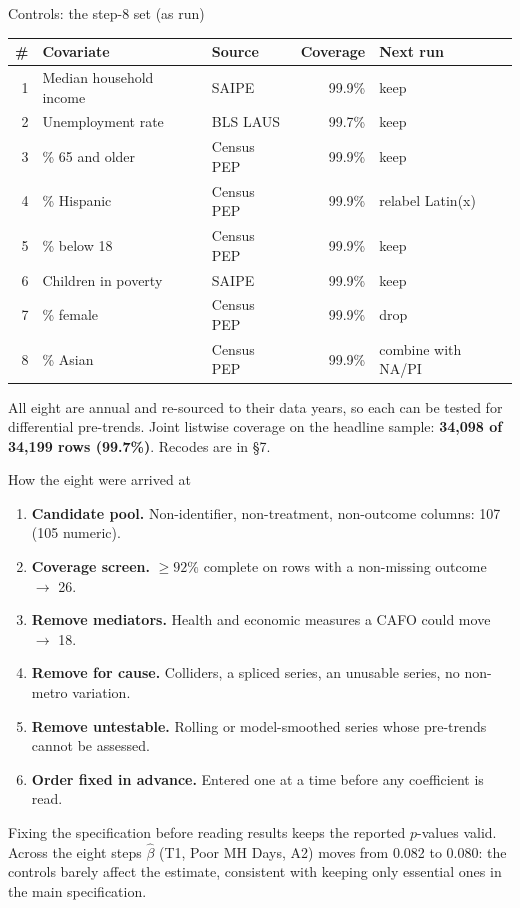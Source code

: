 \documentclass[aspectratio=169]{beamer}
\begin{document}
\begin{frame}{Controls: the step-8 set (as run)}
\vspace{-4pt}
\begin{center}\footnotesize
\begin{tabular}{@{}rllrl@{}}
\toprule
\# & Covariate & Source & Coverage & Next run \\
\midrule
1 & Median household income & SAIPE & 99.9\% & keep \\
2 & Unemployment rate & BLS LAUS & 99.7\% & keep \\
3 & \% 65 and older & Census PEP & 99.9\% & keep \\
4 & \% Hispanic & Census PEP & 99.9\% & relabel Latin(x) \\
5 & \% below 18 & Census PEP & 99.9\% & keep \\
6 & Children in poverty & SAIPE & 99.9\% & keep \\
7 & \% female & Census PEP & 99.9\% & \alert{drop} \\
8 & \% Asian & Census PEP & 99.9\% & combine with NA/PI \\
\bottomrule
\end{tabular}
\end{center}
\vspace{0.3em}
{\footnotesize All eight are annual and re-sourced to their data years, so each can be tested for differential pre-trends. Joint listwise coverage on the headline sample: \textbf{34{,}098 of 34{,}199 rows (99.7\%)}. Recodes are in \S7.}
\end{frame}

\begin{frame}{How the eight were arrived at}
\begin{enumerate}\footnotesize
  \item \textbf{Candidate pool.} Non-identifier, non-treatment, non-outcome columns: 107 (105 numeric).
  \item \textbf{Coverage screen.} $\geq 92\%$ complete on rows with a non-missing outcome $\rightarrow$ 26.
  \item \textbf{Remove mediators.} Health and economic measures a CAFO could move $\rightarrow$ 18.
  \item \textbf{Remove for cause.} Colliders, a spliced series, an unusable series, no non-metro variation.
  \item \textbf{Remove untestable.} Rolling or model-smoothed series whose pre-trends cannot be assessed.
  \item \textbf{Order fixed in advance.} Entered one at a time before any coefficient is read.
\end{enumerate}
\vspace{0.3em}
{\footnotesize Fixing the specification before reading results keeps the reported $p$-values valid. Across the eight steps $\hat\beta$ (T1, Poor MH Days, A2) moves from 0.082 to 0.080: the controls barely affect the estimate, consistent with keeping only essential ones in the main specification.}
\end{frame}
\end{document}
